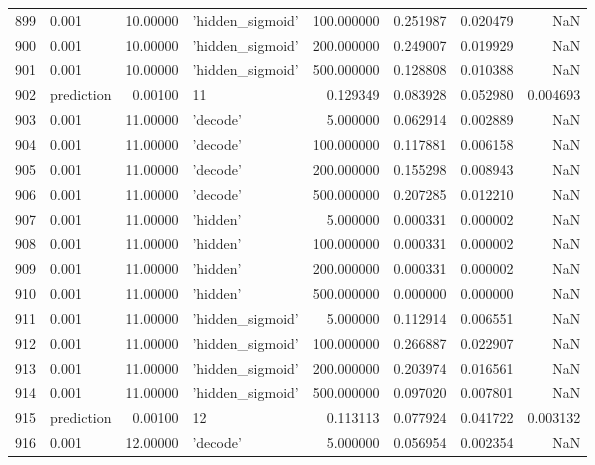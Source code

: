 \documentclass[10pt,a4paper]{article}
\begin{document}
\begin{tabular}{llrlrrrr}
899  &       0.001 &  10.00000 &   'hidden\_sigmoid' &  100.000000 &  0.251987 &  0.020479 &       NaN \\
900  &       0.001 &  10.00000 &   'hidden\_sigmoid' &  200.000000 &  0.249007 &  0.019929 &       NaN \\
901  &       0.001 &  10.00000 &   'hidden\_sigmoid' &  500.000000 &  0.128808 &  0.010388 &       NaN \\
902  &  prediction &   0.00100 &                 11 &    0.129349 &  0.083928 &  0.052980 &  0.004693 \\
903  &       0.001 &  11.00000 &           'decode' &    5.000000 &  0.062914 &  0.002889 &       NaN \\
904  &       0.001 &  11.00000 &           'decode' &  100.000000 &  0.117881 &  0.006158 &       NaN \\
905  &       0.001 &  11.00000 &           'decode' &  200.000000 &  0.155298 &  0.008943 &       NaN \\
906  &       0.001 &  11.00000 &           'decode' &  500.000000 &  0.207285 &  0.012210 &       NaN \\
907  &       0.001 &  11.00000 &           'hidden' &    5.000000 &  0.000331 &  0.000002 &       NaN \\
908  &       0.001 &  11.00000 &           'hidden' &  100.000000 &  0.000331 &  0.000002 &       NaN \\
909  &       0.001 &  11.00000 &           'hidden' &  200.000000 &  0.000331 &  0.000002 &       NaN \\
910  &       0.001 &  11.00000 &           'hidden' &  500.000000 &  0.000000 &  0.000000 &       NaN \\
911  &       0.001 &  11.00000 &   'hidden\_sigmoid' &    5.000000 &  0.112914 &  0.006551 &       NaN \\
912  &       0.001 &  11.00000 &   'hidden\_sigmoid' &  100.000000 &  0.266887 &  0.022907 &       NaN \\
913  &       0.001 &  11.00000 &   'hidden\_sigmoid' &  200.000000 &  0.203974 &  0.016561 &       NaN \\
914  &       0.001 &  11.00000 &   'hidden\_sigmoid' &  500.000000 &  0.097020 &  0.007801 &       NaN \\
915  &  prediction &   0.00100 &                 12 &    0.113113 &  0.077924 &  0.041722 &  0.003132 \\
916  &       0.001 &  12.00000 &           'decode' &    5.000000 &  0.056954 &  0.002354 &       NaN \\

\end{tabular}
\end{document}

